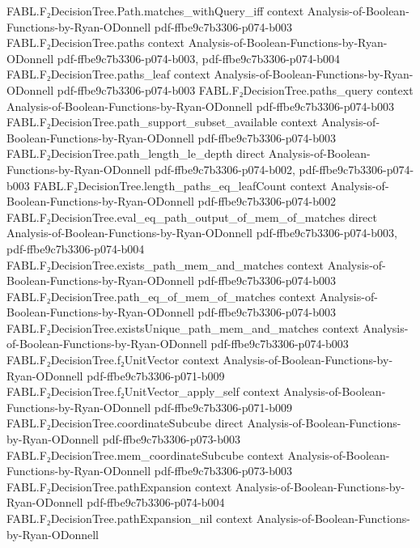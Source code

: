 \begin{theorem}
\proofstep
  {FABL.F₂DecisionTree.Path.matches_withQuery_iff}
  {context}
  {Analysis-of-Boolean-Functions-by-Ryan-ODonnell}
  {pdf-ffbe9c7b3306-p074-b003}
\proofstep
  {FABL.F₂DecisionTree.paths}
  {context}
  {Analysis-of-Boolean-Functions-by-Ryan-ODonnell}
  {pdf-ffbe9c7b3306-p074-b003,
    pdf-ffbe9c7b3306-p074-b004}
\proofstep
  {FABL.F₂DecisionTree.paths_leaf}
  {context}
  {Analysis-of-Boolean-Functions-by-Ryan-ODonnell}
  {pdf-ffbe9c7b3306-p074-b003}
\proofstep
  {FABL.F₂DecisionTree.paths_query}
  {context}
  {Analysis-of-Boolean-Functions-by-Ryan-ODonnell}
  {pdf-ffbe9c7b3306-p074-b003}
\proofstep
  {FABL.F₂DecisionTree.path_support_subset_available}
  {context}
  {Analysis-of-Boolean-Functions-by-Ryan-ODonnell}
  {pdf-ffbe9c7b3306-p074-b003}
\proofstep
  {FABL.F₂DecisionTree.path_length_le_depth}
  {direct}
  {Analysis-of-Boolean-Functions-by-Ryan-ODonnell}
  {pdf-ffbe9c7b3306-p074-b002,
    pdf-ffbe9c7b3306-p074-b003}
\proofstep
  {FABL.F₂DecisionTree.length_paths_eq_leafCount}
  {context}
  {Analysis-of-Boolean-Functions-by-Ryan-ODonnell}
  {pdf-ffbe9c7b3306-p074-b002}
\proofstep
  {FABL.F₂DecisionTree.eval_eq_path_output_of_mem_of_matches}
  {direct}
  {Analysis-of-Boolean-Functions-by-Ryan-ODonnell}
  {pdf-ffbe9c7b3306-p074-b003,
    pdf-ffbe9c7b3306-p074-b004}
\proofstep
  {FABL.F₂DecisionTree.exists_path_mem_and_matches}
  {context}
  {Analysis-of-Boolean-Functions-by-Ryan-ODonnell}
  {pdf-ffbe9c7b3306-p074-b003}
\proofstep
  {FABL.F₂DecisionTree.path_eq_of_mem_of_matches}
  {context}
  {Analysis-of-Boolean-Functions-by-Ryan-ODonnell}
  {pdf-ffbe9c7b3306-p074-b003}
\proofstep
  {FABL.F₂DecisionTree.existsUnique_path_mem_and_matches}
  {context}
  {Analysis-of-Boolean-Functions-by-Ryan-ODonnell}
  {pdf-ffbe9c7b3306-p074-b003}
\proofstep
  {FABL.F₂DecisionTree.f₂UnitVector}
  {context}
  {Analysis-of-Boolean-Functions-by-Ryan-ODonnell}
  {pdf-ffbe9c7b3306-p071-b009}
\proofstep
  {FABL.F₂DecisionTree.f₂UnitVector_apply_self}
  {context}
  {Analysis-of-Boolean-Functions-by-Ryan-ODonnell}
  {pdf-ffbe9c7b3306-p071-b009}
\proofstep
  {FABL.F₂DecisionTree.coordinateSubcube}
  {direct}
  {Analysis-of-Boolean-Functions-by-Ryan-ODonnell}
  {pdf-ffbe9c7b3306-p073-b003}
\proofstep
  {FABL.F₂DecisionTree.mem_coordinateSubcube}
  {context}
  {Analysis-of-Boolean-Functions-by-Ryan-ODonnell}
  {pdf-ffbe9c7b3306-p073-b003}
\proofstep
  {FABL.F₂DecisionTree.pathExpansion}
  {context}
  {Analysis-of-Boolean-Functions-by-Ryan-ODonnell}
  {pdf-ffbe9c7b3306-p074-b004}
\proofstep
  {FABL.F₂DecisionTree.pathExpansion_nil}
  {context}
  {Analysis-of-Boolean-Functions-by-Ryan-ODonnell}

\end{theorem}
